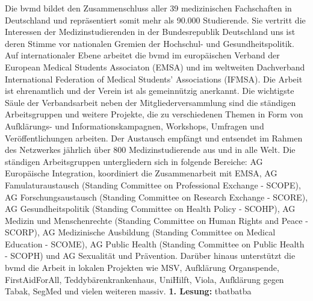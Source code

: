 {    Die bvmd bildet den Zusammenschluss aller 39 medizinischen Fachschaften in Deutschland und repräsentiert somit mehr als 90.000 Studierende. Sie vertritt die Interessen der Medizinstudierenden in der Bundesrepublik Deutschland uns ist deren Stimme vor nationalen Gremien der Hochschul- und Gesundheitspolitik. Auf internationaler Ebene arbeitet die bvmd im europäischen Verband der European Medical Students Associaton (EMSA) und im weltweiten Dachverband International Federation of Medical Students’ Associations (IFMSA). Die Arbeit ist ehrenamtlich und der Verein ist als gemeinnützig anerkannt. Die wichtigste Säule der Verbandsarbeit neben der Mitgliederversammlung sind die ständigen Arbeitsgruppen und weitere Projekte, die zu verschiedenen Themen in Form von Aufklärungs- und Informationskampagnen, Workshops, Umfragen und Veröffentlichungen arbeiten. Der Austausch empfängt und entsendet im Rahmen des Netzwerkes jährlich über 800 Medizinstudierende aus und in alle Welt. Die ständigen Arbeitsgruppen untergliedern sich in folgende Bereiche: AG Europäische Integration, koordiniert die Zusammenarbeit mit EMSA, AG Famulaturaustausch (Standing Committee on Professional Exchange - SCOPE), AG Forschungsaustausch (Standing Committee on Research Exchange - SCORE), AG Gesundheitspolitik (Standing Committee on Health Policy - SCOHP), AG Medizin und Menschenrechte (Standing Committee on Human Rights and Peace - SCORP), AG Medizinische Ausbildung (Standing Committee on Medical Education - SCOME), AG Public Health (Standing Committee on Public Health - SCOPH) und AG Sexualität und Prävention. Darüber hinaus unterstützt die bvmd die Arbeit in lokalen Projekten wie MSV, Aufklärung Organspende, FirstAidForAll, Teddybärenkrankenhaus, UniHilft, Viola, Aufklärung gegen Tabak, SegMed und vielen weiteren massiv.
}{
    \textbf{1. Lesung:}
    \ul{
}
}{tba}{tba}{tba}
